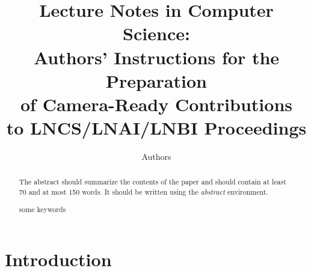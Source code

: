 \documentclass[runningheads,a4paper]{llncs}
\newcommand{\keywords}[1]{\par\addvspace\baselineskip
\noindent\keywordname\enspace\ignorespaces#1}
\begin{document}
\mainmatter  %

\title{Lecture Notes in Computer Science:\\Authors' Instructions
for the Preparation\\of Camera-Ready
Contributions\\to LNCS/LNAI/LNBI Proceedings}


%
%
\author{Authors}%
%



\maketitle



\begin{abstract}
The abstract should summarize the contents of the paper and should
contain at least 70 and at most 150 words. It should be written using the
\emph{abstract} environment.
\keywords{some keywords}
\end{abstract}


\section{Introduction}
\cite{Microsoft:Tied}



\end{document}
